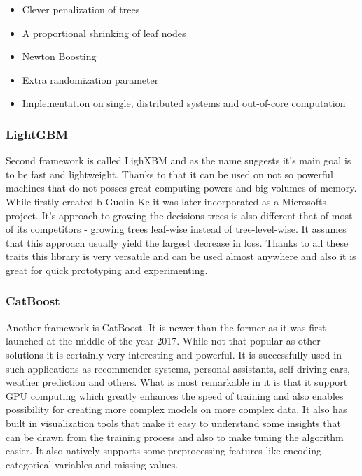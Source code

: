 \documentclass[a4paper,twoside,12pt]{book}
\begin{document}
\begin{itemize}
\item Clever penalization of trees
\item A proportional shrinking of leaf nodes
\item Newton Boosting
\item Extra randomization parameter
\item Implementation on single, distributed systems and out-of-core computation
\end{itemize}


\subsubsection{LightGBM}

Second framework is called LighXBM and as the name suggests it's main goal is to be fast and lightweight. Thanks to that it can be used on not so powerful machines that do not posses great computing powers and big volumes of memory. While firstly created b Guolin Ke it was later incorporated as a Microsofts project. It's approach to growing the decisions trees is also different that of most of its competitors - growing trees leaf-wise instead of tree-level-wise. It assumes that this approach usually yield the largest decrease in loss. Thanks to all these traits this library is very versatile and can be used almost anywhere and also it is great for quick prototyping and experimenting. 

\subsubsection{CatBoost}

Another framework is CatBoost. It is newer than the former as it was first launched at the middle of the year 2017. While not that popular as other solutions it is certainly very interesting and powerful. It is successfully used in such applications as recommender systems, personal assistants, self-driving cars, weather prediction and others. What is most remarkable in it is that it support GPU computing which greatly enhances the speed of training and also enables possibility for creating more complex models on more complex data. It also has built in visualization tools that make it easy to understand some insights that can be drawn from the training process and also to make tuning the algorithm easier. It also natively supports some preprocessing features like encoding categorical variables and missing values.
\end{document}
